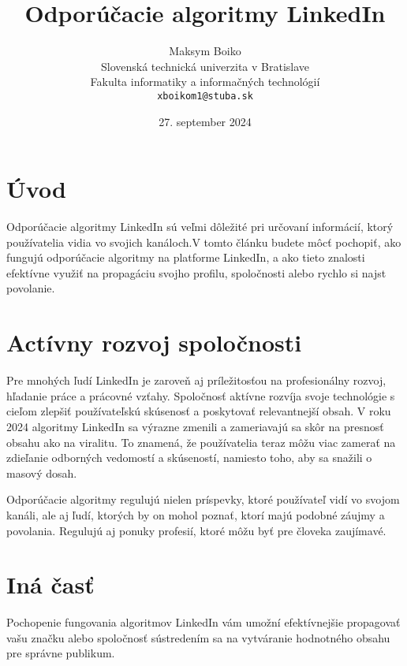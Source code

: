 \documentclass[twoside,slovak,a4paper]{coursepaper}
\title{Odporúčacie algoritmy LinkedIn\centering}
\author{Maksym Boiko\\[2pt]
	{ Slovenská technická univerzita v Bratislave}\\
	{ Fakulta informatiky a informačných technológií}\\
	{ \texttt{xboikom1@stuba.sk}}
	}
\date{\small 27. september 2024}
\begin{document}
\maketitle

\section{Úvod}
Odporúčacie algoritmy LinkedIn sú veľmi dôležité pri určovaní informácií, ktorý používatelia vidia vo svojich kanáloch.V tomto článku budete môcť pochopiť, ako fungujú odporúčacie algoritmy na platforme LinkedIn, a ako tieto znalosti efektívne využiť na propagáciu svojho profilu, spoločnosti alebo rychlo si najst povolanie.

\section{Actívny rozvoj spoločnosti} \label{rozvoj spoločnosti}
Pre mnohých ľudí LinkedIn je zaroveň aj príležitosťou na profesionálny rozvoj, hľadanie práce a prácovné vzťahy.
Spoločnosť aktívne rozvíja svoje technológie s cieľom zlepšiť používateľskú skúsenosť a poskytovať relevantnejší obsah. V roku 2024 algoritmy LinkedIn sa výrazne zmenili a zameriavajú sa skôr na presnosť obsahu ako na viralitu. To znamená, že používatelia teraz môžu viac zamerať na zdieľanie odborných vedomostí a skúseností, namiesto toho, aby sa snažili o masový dosah.

Odporúčacie algoritmy regulujú nielen príspevky, ktoré používateľ vidí vo svojom kanáli, ale aj ľudí, ktorých by on mohol poznať, ktorí majú podobné záujmy a povolania. Regulujú aj ponuky profesií, ktoré môžu byť pre človeka zaujímavé.~\cite{Oladipo:article}

\section{Iná časť} \label{ina}
Pochopenie fungovania algoritmov LinkedIn vám umožní efektívnejšie propagovať vašu značku alebo spoločnosť sústredením sa na vytváranie hodnotného obsahu pre správne publikum.



\end{document}
